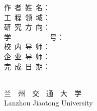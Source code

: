 \documentclass[a4paper, 12pt, twoside]{article} %
\begin{document}
	\vspace{13\baselineskip}
	\begin{center}
		作~者~姓~名：\underline{}\\
		工~程~领~域：\underline{}\\
		研~究~方~向：\underline{}\\
		学~~~~~~~~~~~号：\underline{}\\
		校~内~导~师：\underline{}\\
		企~业~导~师：\underline{}\\
		完~成~日~期：\underline{}
		
		\vspace{1\baselineskip}
		~\\
		兰~~州~~交~~通~~大~~学\\
		Lanzhou Jiaotong University	
	\end{center}
\end{document}
